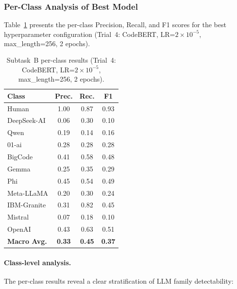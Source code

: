 \documentclass[11pt]{article}
\begin{document}
\subsubsection{Per-Class Analysis of Best Model}
\label{sec:taskB_perclass}

Table~\ref{tab:taskB_perclass} presents the per-class Precision, Recall, and F1 scores for the best hyperparameter configuration (Trial~4: CodeBERT, LR=$2{\times}10^{-5}$, max\_length=256, 2 epochs).

\begin{table}[htbp]
\centering
\footnotesize
\begin{tabularx}{\columnwidth}{@{}l c c c@{}}
\toprule
\textbf{Class} & \textbf{Prec.} & \textbf{Rec.} & \textbf{F1} \\ \midrule
Human & 1.00 & 0.87 & 0.93 \\
DeepSeek-AI & 0.06 & 0.30 & 0.10 \\
Qwen & 0.19 & 0.14 & 0.16 \\
01-ai & 0.28 & 0.28 & 0.28 \\
BigCode & 0.41 & 0.58 & 0.48 \\
Gemma & 0.25 & 0.35 & 0.29 \\
Phi & 0.45 & 0.54 & 0.49 \\
Meta-LLaMA & 0.20 & 0.30 & 0.24 \\
IBM-Granite & 0.31 & 0.82 & 0.45 \\
Mistral & 0.07 & 0.18 & 0.10 \\
OpenAI & 0.43 & 0.63 & 0.51 \\ \midrule
\textbf{Macro Avg.} & \textbf{0.33} & \textbf{0.45} & \textbf{0.37} \\
\bottomrule
\end{tabularx}
\caption{Subtask~B per-class results (Trial~4: CodeBERT, LR=$2{\times}10^{-5}$, max\_length=256, 2 epochs).}
\label{tab:taskB_perclass}
\end{table}

\paragraph{Class-level analysis.}
The per-class results reveal a clear stratification of LLM family detectability:
\end{document}
